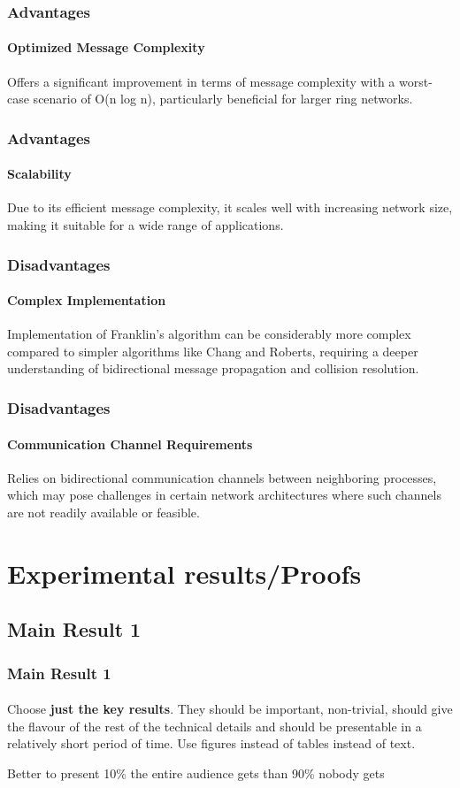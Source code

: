 \documentclass[11pt]{beamer}              %
\begin{document}
\begin{frame}
\frametitle{Advantages}
\framesubtitle{Optimized Message Complexity}
Offers a significant improvement in terms of message complexity with a worst-case scenario of O(n log n), particularly beneficial for larger ring networks.
\end{frame}

\begin{frame}
    \frametitle{Advantages}
    \framesubtitle{Scalability}
    Due to its efficient message complexity, it scales well with increasing network size, making it suitable for a wide range of applications.
\end{frame}


\begin{frame}
    \frametitle{Disadvantages}
    \framesubtitle{Complex Implementation}
    Implementation of Franklin’s algorithm can be considerably more complex compared to simpler algorithms like Chang and Roberts, requiring a deeper understanding of bidirectional message propagation and collision resolution.
\end{frame}


\begin{frame}
    \frametitle{Disadvantages}
    \framesubtitle{Communication Channel Requirements}
    Relies on bidirectional communication channels between neighboring processes, which may pose challenges in certain network architectures where such channels are not readily available or feasible.
\end{frame}







\section{Experimental results/Proofs}

\subsection{Main Result 1}
\begin{frame}
\frametitle{Main Result 1}
\framesubtitle{}
Choose \textbf{just the key results}. They should be important, non-trivial, should give the flavour of the rest of the technical details and should be presentable in a relatively short period of time. Use figures instead of tables instead of text.

Better to present 10\% the entire audience gets than 90\% nobody gets
\end{frame}
\end{document}
